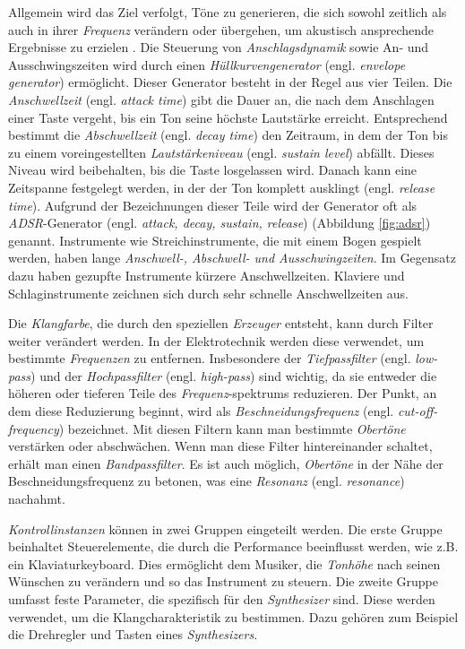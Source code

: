 \documentclass[
  a4paper,  %
  twoside,  %
  bibliography=totoc,
  headsepline,
  cleardoublepage=empty,
  parskip=half,
  draft=false
]{scrbook}
\begin{document}
Allgemein wird das Ziel verfolgt, Töne zu generieren, die sich sowohl zeitlich als auch in ihrer \emph{Frequenz} verändern oder übergehen, um akustisch ansprechende Ergebnisse zu erzielen \cite{pirkle_designing_2021}. Die Steuerung von \emph{Anschlagsdynamik} sowie An- und Ausschwingszeiten wird durch einen \emph{Hüllkurvengenerator} (engl. \emph{envelope generator}) ermöglicht. Dieser Generator besteht in der Regel aus vier Teilen. Die \emph{Anschwellzeit} (engl. \emph{attack time}) gibt die Dauer an, die nach dem Anschlagen einer Taste vergeht, bis ein Ton seine höchste Lautstärke erreicht. Entsprechend bestimmt die \emph{Abschwellzeit} (engl. \emph{decay time}) den Zeitraum, in dem der Ton bis zu einem voreingestellten \emph{Lautstärkeniveau} (engl. \emph{sustain level}) abfällt. Dieses Niveau wird beibehalten, bis die Taste losgelassen wird. Danach kann eine Zeitspanne festgelegt werden, in der der Ton komplett ausklingt (engl. \emph{release time}). Aufgrund der Bezeichnungen dieser Teile wird der Generator oft als \emph{ADSR}-Generator (engl. \emph{attack, decay, sustain, release}) (Abbildung \ref{fig:adsr}) genannt. Instrumente wie Streichinstrumente, die mit einem Bogen gespielt werden, haben lange \emph{Anschwell-, Abschwell- und Ausschwingzeiten}. Im Gegensatz dazu haben gezupfte Instrumente kürzere Anschwellzeiten. Klaviere und Schlaginstrumente zeichnen sich durch sehr schnelle Anschwellzeiten aus. \cite{ruschkowski_elektronische_2019, russ_sound_2009}

Die \emph{Klangfarbe}, die durch den speziellen \emph{Erzeuger} entsteht, kann durch Filter weiter verändert werden. In der Elektrotechnik werden diese verwendet, um bestimmte \emph{Frequenzen} zu entfernen. Insbesondere der \emph{Tiefpassfilter} (engl. \emph{low-pass}) und der \emph{Hochpassfilter} (engl. \emph{high-pass}) sind wichtig, da sie entweder die höheren oder tieferen Teile des \emph{Frequenz}-spektrums reduzieren. Der Punkt, an dem diese Reduzierung beginnt, wird als \emph{Beschneidungsfrequenz} (engl. \emph{cut-off-frequency}) bezeichnet. Mit diesen Filtern kann man bestimmte \emph{Obertöne} verstärken oder abschwächen. Wenn man diese Filter hintereinander schaltet, erhält man einen \emph{Bandpassfilter}. Es ist auch möglich, \emph{Obertöne} in der Nähe der Beschneidungsfrequenz zu betonen, was eine \emph{Resonanz} (engl. \emph{resonance}) nachahmt. \cite{ruschkowski_elektronische_2019}

\emph{Kontrollinstanzen} können in zwei Gruppen eingeteilt werden. Die erste Gruppe beinhaltet Steuerelemente, die durch die Performance beeinflusst werden, wie z.B. ein Klaviaturkeyboard. Dies ermöglicht dem Musiker, die \emph{Tonhöhe} nach seinen Wünschen zu verändern und so das Instrument zu steuern. Die zweite Gruppe umfasst feste Parameter, die spezifisch für den \emph{Synthesizer} sind. Diese werden verwendet, um die Klangcharakteristik zu bestimmen. Dazu gehören zum Beispiel die Drehregler und Tasten eines \emph{Synthesizers}. \cite{russ_sound_2009}
\end{document}
